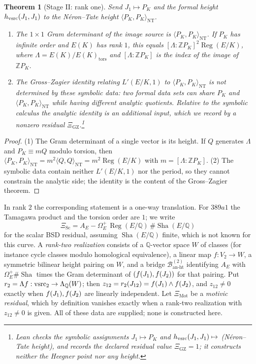 \documentclass[11pt]{article}
\newtheorem{theorem}{Theorem}[section]
\theoremstyle{definition}
\newcommand{\Q}{\mathbb{Q}}
\newcommand{\Z}{\mathbb{Z}}
\newcommand{\Sha}{\operatorname{Sha}}
\newcommand{\Reg}{\operatorname{Reg}}
\newcommand{\tors}{\operatorname{tors}}
\newcommand{\Jtwo}{J_2}
\newcommand{\Jtwelve}{J_{12}}
\begin{document}
\begin{theorem}[Stage II: rank one]\label{thm:apparatus:vsrc-stage-ii-gz-partial}
Send $J_1\mapsto P_K$ and the formal height $h_{\mathrm{vsrc}}(J_1,J_1)$ to the
N\'eron--Tate height $\langle P_K,P_K\rangle_{\mathrm{NT}}$.
\begin{enumerate}
\item The $1\times1$ Gram determinant of the image source is
  $\langle P_K,P_K\rangle_{\mathrm{NT}}$.  If $P_K$ has infinite order and
  $E(K)$ has rank $1$, this equals $[\Lambda:\Z P_K]^2\Reg(E/K)$, where
  $\Lambda=E(K)/E(K)_{\tors}$ and $[\Lambda:\Z P_K]$ is the index of the
  image of $\Z P_K$.
\item The Gross--Zagier identity relating $L'(E/K,1)$ to
  $\langle P_K,P_K\rangle_{\mathrm{NT}}$ is not determined by these
  symbolic data: two formal data sets can share $P_K$ and
  $\langle P_K,P_K\rangle_{\mathrm{NT}}$ while having different analytic
  quotients.  Relative to the symbolic calculus the analytic identity is an
  additional input, which we record by a nonzero residual
  $\Xi_{\mathrm{GZ}}$.\footnote{Lean checks the symbolic assignments $J_1\mapsto P_K$ and
$h_{\mathrm{vsrc}}(J_1,J_1)\mapsto$ (N\'eron--Tate height), and records the
declared residual value $\Xi_{\mathrm{GZ}}=1$; it constructs neither the
Heegner point nor any height.}
\end{enumerate}
\end{theorem}

\begin{proof}
(1) The Gram determinant of a single vector is its height.  If $Q$
generates $\Lambda$ and $P_K\equiv mQ$ modulo torsion, then
$\langle P_K,P_K\rangle_{\mathrm{NT}}=m^2\langle Q,Q\rangle_{\mathrm{NT}}
=m^2\Reg(E/K)$ with $m=[\Lambda:\Z P_K]$.  (2) The symbolic data contain
neither $L'(E/K,1)$ nor the period, so they cannot constrain the analytic
side; the identity is the content of the Gross--Zagier theorem.
\end{proof}

In rank $2$ the corresponding statement is a one-way translation.  For
$389a1$ the Tamagawa product and the torsion order are $1$; we write
\[
  \Xi_{\mathrm{Sc}}
  =A_E-\Omega_E^+\,\Reg(E/\Q)\,\#\Sha(E/\Q)
\]
for the scalar BSD residual, assuming $\Sha(E/\Q)$ finite, which is not
known for this curve.  A \emph{rank-two realization} consists of a
$\Q$-vector space $W$ of classes (for instance cycle classes modulo
homological equivalence), a linear map $f:V_2\to W$, a symmetric
bilinear height pairing on $W$, and a bridge
$\mathcal B^{(2)}_{\mathrm{an\text{-}ht}}$ identifying $A_E$ with
$\Omega_E^+\#\Sha$ times the Gram determinant of $(f(\Jone),f(\Jtwo))$
for that pairing.  Put $r_2=\Lambda f:\vsrc_2\to\Lambda_{\Q}(W)$; then
$z_{12}=r_2(\Jtwelve)=f(\Jone)\wedge f(\Jtwo)$, and $z_{12}\neq0$ exactly
when $f(\Jone),f(\Jtwo)$ are linearly independent.  Let
$\Xi_{\mathrm{Mot}}$ be a \emph{motivic residual}, which by definition
vanishes exactly when a rank-two realization with $z_{12}\neq0$ is given.
All of these data are supplied; none is constructed here.
\end{document}
